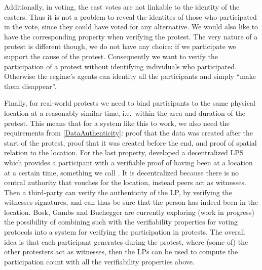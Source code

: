Additionally, in voting, the cast votes are not linkable to the identity of the 
casters.
Thus it is not a problem to reveal the identites of those who participated in 
the vote, since they could have voted for any alternative.
We would also like to have the corresponding property when verifying the 
protest.
The very nature of a protest is different though, we do not have any choice: if 
we participate we support the cause of the protest.
Consequently we want to verify the participation of a protest without 
identifying individuals who participated.
Otherwise the regime's agents can identity all the participants and simply 
\enquote{make them disappear}. %

Finally, for real-world protests we need to bind participants to the same 
physical location at a reasonably similar time, i.e.\ within the area and 
duration of the protest.
This means that for a system like this to work, we also need the requirements 
from \cref{DataAuthenticity}: proof that the data was created after the start 
of the protest, proof that it was created before the end, and proof of spatial 
relation to the location.
For the last property, \citet{PROPS} developed a decentralized \ac{LPS} which 
provides a participant with a verifiable proof of having been at a location at 
a certain time, something we call .
It is decentralized because there is no central authority that vouches for the 
location, instead peers act as witnesses.
Then a third-party can verify the authenticity of the \ac{LP}, by verifying the 
witnesses signatures, and can thus be sure that the person has indeed been in 
the location.
Bosk, Gambs and Buchegger are currently exploring (work in progress) the 
possibility of combining such  with the verifiability properties for 
voting protocols into a system for verifying the participation in protests.
The overall idea is that each participant generates  during the 
protest, where (some of) the other protesters act as witnesses, then the 
\acp{LP} can be used to compute the participation count with all the 
verifiability properties above.

